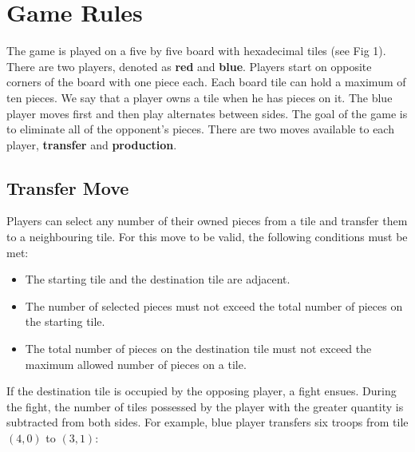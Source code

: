 \documentclass[letterpaper, 12pt]{article}
\begin{document}
\section*{Game Rules}
The game is played on a five by five board with hexadecimal tiles (see Fig 1). There are
two players, denoted as \textbf{red} and \textbf{blue}. Players start on opposite
corners of the board with one piece each. Each board tile can hold a maximum of ten
pieces. We say that a player owns a tile when he has pieces on it. The blue player moves
first and then play alternates between sides. The goal of the game is to eliminate all
of the opponent's pieces. There are two moves available to each player, \textbf{transfer}
and \textbf{production}.

\subsection*{Transfer Move}
Players can select any number of their owned pieces from a tile and transfer them to a 
neighbouring tile. For this move to be valid, the following conditions must be met:
\begin{itemize}
  \item The starting tile and the destination tile are adjacent.
  \item The number of selected pieces must not exceed the total number of pieces on the
    starting tile.
  \item The total number of pieces on the destination tile must not exceed the maximum 
    allowed number of pieces on a tile.
\end{itemize}
If the destination tile is occupied by the opposing player, a fight ensues. During the
fight, the number of tiles possessed by the player with the greater quantity is 
subtracted from both sides. For example, blue player transfers six troops from tile
\((4, 0)\) to \((3, 1)\):
\end{document}
